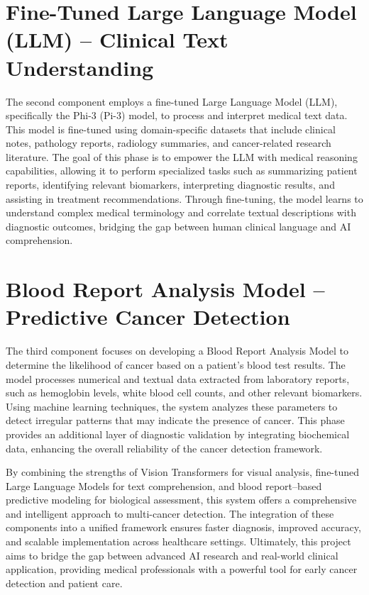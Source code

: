 \documentclass[a4paper,12pt]{report}
\begin{document}
\begin{doublespace}
\section{Fine-Tuned Large Language Model (LLM) – Clinical Text Understanding}
\label{sec:1.2}
\vspace{0.2cm}

{\fontsize{12pt}{18pt}\selectfont
The second component employs a fine-tuned Large Language Model (LLM), specifically the Phi-3 (Pi-3) model, to process and interpret medical text data. This model is fine-tuned using domain-specific datasets that include clinical notes, pathology reports, radiology summaries, and cancer-related research literature. The goal of this phase is to empower the LLM with medical reasoning capabilities, allowing it to perform specialized tasks such as summarizing patient reports, identifying relevant biomarkers, interpreting diagnostic results, and assisting in treatment recommendations. Through fine-tuning, the model learns to understand complex medical terminology and correlate textual descriptions with diagnostic outcomes, bridging the gap between human clinical language and AI comprehension.
}
\vspace{0.2cm}
\section{Blood Report Analysis Model – Predictive Cancer Detection}
\label{sec:1.3}
\vspace{0.2cm}

{\fontsize{12pt}{18pt}\selectfont
The third component focuses on developing a Blood Report Analysis Model to determine the likelihood of cancer based on a patient’s blood test results. The model processes numerical and textual data extracted from laboratory reports, such as hemoglobin levels, white blood cell counts, and other relevant biomarkers. Using machine learning techniques, the system analyzes these parameters to detect irregular patterns that may indicate the presence of cancer. This phase provides an additional layer of diagnostic validation by integrating biochemical data, enhancing the overall reliability of the cancer detection framework.

By combining the strengths of Vision Transformers for visual analysis, fine-tuned Large Language Models for text comprehension, and blood report–based predictive modeling for biological assessment, this system offers a comprehensive and intelligent approach to multi-cancer detection. The integration of these components into a unified framework ensures faster diagnosis, improved accuracy, and scalable implementation across healthcare settings. Ultimately, this project aims to bridge the gap between advanced AI research and real-world clinical application, providing medical professionals with a powerful tool for early cancer detection and patient care.
}

\vspace{0.6cm}
\end{doublespace}
\end{document}
